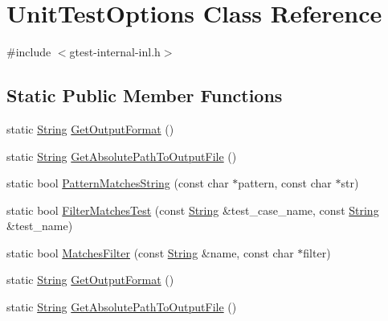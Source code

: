 \hypertarget{classtesting_1_1internal_1_1UnitTestOptions}{\section{\-Unit\-Test\-Options \-Class \-Reference}
\label{d3/d9a/classtesting_1_1internal_1_1UnitTestOptions}
}


{\ttfamily \#include $<$gtest-\/internal-\/inl.\-h$>$}

\subsection*{\-Static \-Public \-Member \-Functions}
\begin{DoxyCompactItemize}
\item 
static \hyperlink{classtesting_1_1internal_1_1String}{\-String} \hyperlink{classtesting_1_1internal_1_1UnitTestOptions_ab74136cb3ba94d7dbbda58ac081d9da2}{\-Get\-Output\-Format} ()
\item 
static \hyperlink{classtesting_1_1internal_1_1String}{\-String} \hyperlink{classtesting_1_1internal_1_1UnitTestOptions_a765b1715a62bfdb0eaa4063b516dbc84}{\-Get\-Absolute\-Path\-To\-Output\-File} ()
\item 
static bool \hyperlink{classtesting_1_1internal_1_1UnitTestOptions_a6ee16a491a18920bed2d8e1c5a6be381}{\-Pattern\-Matches\-String} (const char $\ast$pattern, const char $\ast$str)
\item 
static bool \hyperlink{classtesting_1_1internal_1_1UnitTestOptions_a5729694202f5ce85701d892a6c65f921}{\-Filter\-Matches\-Test} (const \hyperlink{classtesting_1_1internal_1_1String}{\-String} \&test\-\_\-case\-\_\-name, const \hyperlink{classtesting_1_1internal_1_1String}{\-String} \&test\-\_\-name)
\item 
static bool \hyperlink{classtesting_1_1internal_1_1UnitTestOptions_a2668b814cce76871ca391416634bd020}{\-Matches\-Filter} (const \hyperlink{classtesting_1_1internal_1_1String}{\-String} \&name, const char $\ast$filter)
\item 
static \hyperlink{classtesting_1_1internal_1_1String}{\-String} \hyperlink{classtesting_1_1internal_1_1UnitTestOptions_a514e9cdafd260d49db49a1f3635f1e06}{\-Get\-Output\-Format} ()
\item 
static \hyperlink{classtesting_1_1internal_1_1String}{\-String} \hyperlink{classtesting_1_1internal_1_1UnitTestOptions_abd15161f948226c8826bcfab3a0f1b6c}{\-Get\-Absolute\-Path\-To\-Output\-File} ()
\item 

\end{DoxyCompactItemize}

